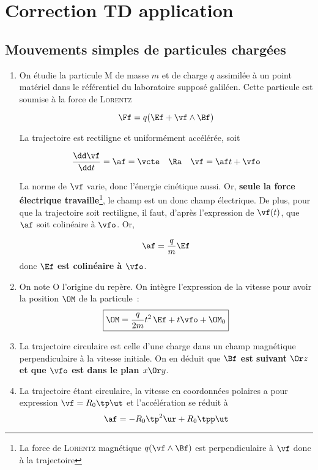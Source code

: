 \documentclass[a4paper, 12pt, final, garamond]{book}
\begin{document}
\setcounter{chapter}{4}

\chapter{Correction TD application}

\section{Mouvements simples de particules chargées}
\begin{enumerate}
    \item On étudie la particule M de masse $m$ et de charge $q$ assimilée à
        un point matériel dans le référentiel du laboratoire supposé galiléen.
        Cette particule est soumise à la force de \textsc{Lorentz}

        \[
            \Ff = q(\Ef+\vf\wedge \Bf)
        \]
        
        La trajectoire est rectiligne et uniformément accélérée, soit

        \[
            \frac{\dd \vf}{\dd t}
                = \af
                = \vcte
            \quad \Ra \quad
            \vf = \af t + \vfo
        \]

        La norme de $\vf$ varie, donc l'énergie cinétique aussi. Or,
        \textbf{seule la force électrique travaille}\footnote{La force de
        \textsc{Lorentz} magnétique $q (\vf\wedge\Bf)$ est perpendiculaire à
        $\vf$ donc à la trajectoire}, le champ est un donc champ électrique. De
        plus, pour que la trajectoire soit rectiligne, il faut, d'après
        l'expression de $\vf(t)$, que $\af$ soit colinéaire à $\vfo$. Or,

        \[
            \af = \frac{q}{m}\Ef
        \]
        donc \textbf{$\Ef$ est colinéaire à $\vfo$}.

    \item On note O l'origine du repère. On intègre l'expression de la vitesse
        pour avoir la position $\OM$ de la particule~:
        \[
            \boxed{\OM = \frac{q}{2m} t^2 \, \Ef + t \vfo + \OM_0}
        \]

    \item  La trajectoire circulaire est celle d'une charge dans un champ
        magnétique perpendiculaire à la vitesse initiale. On en déduit que
        \textbf{$\Bf$ est suivant $\Or z$ et que $\vfo$ est dans le plan $x\Or
        y$}.

    \item La trajectoire étant circulaire, la vitesse en coordonnées polaires a
        pour expression $\vf = R_0 \tp \ut$ et
        l'accélération se réduit à 
        \[
            \af = -R_0 \tp^2 \ur + R_0 \tpp \ut
        \]


\end{enumerate}
\end{document}
